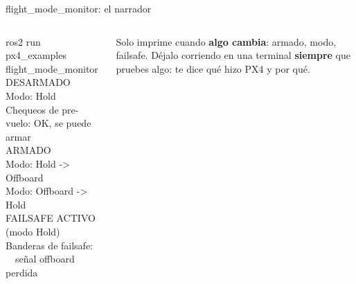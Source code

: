 \begin{frame}{flight\_mode\_monitor: el narrador}
  \begin{columns}[c]
    \begin{terminal}{ros2 run px4\_examples flight\_mode\_monitor}
DESARMADO\\
Modo: Hold\\
Chequeos de pre-vuelo: OK, se puede armar\\
ARMADO\\
Modo: Hold -> Offboard\\
Modo: Offboard -> Hold\\
FAILSAFE ACTIVO (modo Hold)\\
Banderas de failsafe:\\
\ \ señal offboard perdida
    \end{terminal}
    \centering
    \vspace{0.6em}

    \raggedright\small Solo imprime cuando \textbf{algo cambia}: armado, modo, failsafe. Déjalo corriendo en una
    terminal \textbf{siempre} que pruebes algo: te dice qué hizo PX4 y por qué.
  \end{columns}
\end{frame}

